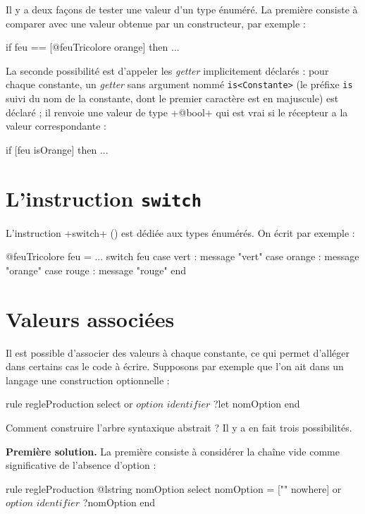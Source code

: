 
Il y a deux façons de tester une valeur d'un type énuméré. La première consiste à comparer avec une valeur obtenue par un constructeur, par exemple :
\begin{galgascode}
  if feu == [@feuTricolore orange] then ...
\end{galgascode}

La seconde possibilité est d'appeler les \emph{getter} implicitement déclarés : pour chaque constante, un \emph{getter} sans argument nommé  \texttt{is<Constante>} (le préfixe \texttt{is} suivi du nom de la constante, dont le premier caractère est en majuscule) est déclaré ; il renvoie une valeur de type \ggs+@bool+ qui est vrai si le récepteur a la valeur correspondante :
\begin{galgascode}
  if [feu isOrange] then ...
\end{galgascode}

\section{L'instruction \texttt{switch}}

L'instruction \ggs+switch+ () est dédiée aux types énumérés. On écrit par exemple :

\begin{galgascode}
@feuTricolore feu = ...
switch feu
case vert : message "vert"
case orange : message "orange"
case rouge : message "rouge" 
end
\end{galgascode}


\section{Valeurs associées}

Il est possible d'associer des valeurs à chaque constante, ce qui permet d'alléger dans certains cas le code à écrire. Supposons par exemple que l'on ait dans un langage une construction optionnelle :

\begin{galgascode}
rule regleProduction {
  select
  or
    $option$
    $identifier$ ?let nomOption
  end
}
\end{galgascode}

Comment construire l'arbre syntaxique abstrait ? Il y a en fait trois possibilités.

\textbf{Première solution.} La première consiste à considérer la chaîne vide comme significative de l'absence d'option :
\begin{galgascode}
rule regleProduction {
  @lstring nomOption
  select
    nomOption = ["" nowhere]
  or
    $option$
    $identifier$ ?nomOption
  end
}
\end{galgascode}

